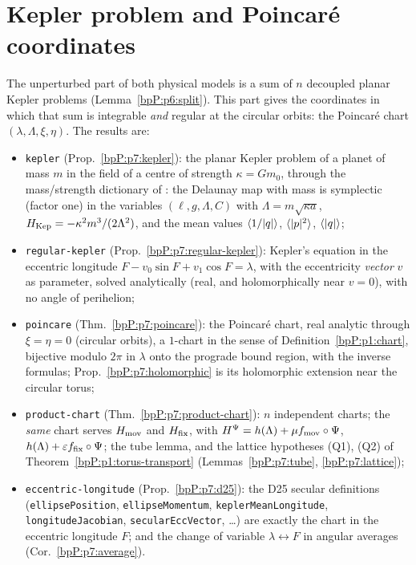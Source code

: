 \section{Kepler problem and Poincar\'e coordinates}\label{bpP:p7}
\begingroup\sloppy

The unperturbed part of both physical models is a sum of $n$ decoupled planar Kepler problems (Lemma~\ref{bpP:p6:split}). This part
gives the coordinates in which that sum is integrable \emph{and} regular at the circular orbits: the Poincar\'e chart
$(\lambda,\Lambda,\xi,\eta)$. The results are:
\begin{itemize}
\item \texttt{kepler} (Prop.~\ref{bpP:p7:kepler}): the planar Kepler problem of a planet of mass $m$ in the field of a centre of strength $\kappa=Gm_0$, through the
mass/strength dictionary of : the Delaunay map with mass is symplectic (factor one) in the variables $(\ell,g,\Lambda,C)$ with $\Lambda=m\sqrt{\kappa a}$,
$H_{\rm Kep}=-\kappa^2m^3/(2\Lambda^2)$, and the mean values $\langle1/\lvert q\rvert\rangle$, $\langle\lvert p\rvert^2\rangle$, $\langle\lvert q\rvert\rangle$;
\item \texttt{regular-kepler} (Prop.~\ref{bpP:p7:regular-kepler}): Kepler's equation in the eccentric longitude $F-v_0\sin F+v_1\cos F=\lambda$, with the eccentricity \emph{vector} $v$ as parameter, solved
analytically (real, and holomorphically near $v=0$), with no angle of perihelion;
\item \texttt{poincare} (Thm.~\ref{bpP:p7:poincare}): the Poincar\'e chart, real analytic through $\xi=\eta=0$ (circular orbits), a $1$-chart in the sense of
Definition~\ref{bpP:p1:chart}, bijective modulo $2\pi$ in $\lambda$ onto the prograde bound region, with the inverse formulas; Prop.~\ref{bpP:p7:holomorphic} is its holomorphic
extension near the circular torus;
\item \texttt{product-chart} (Thm.~\ref{bpP:p7:product-chart}): $n$ independent charts; the \emph{same} chart serves $H_{\rm mov}$ and $H_{\rm fix}$, with $H^\Psi=h(\Lambda)+\mu f_{\rm mov}\circ\Psi$,
$h(\Lambda)+\varepsilon f_{\rm fix}\circ\Psi$; the tube lemma, and the lattice hypotheses (Q1), (Q2) of Theorem~\ref{bpP:p1:torus-transport} (Lemmas~\ref{bpP:p7:tube}, \ref{bpP:p7:lattice});
\item \texttt{eccentric-longitude} (Prop.~\ref{bpP:p7:d25}): the D25 secular definitions (\texttt{ellipsePosition}, \texttt{ellipseMomentum}, \texttt{keplerMeanLongitude}, \texttt{longitudeJacobian}, \texttt{secularEccVector}, \dots)
are exactly the chart in the eccentric longitude $F$; and the change of variable $\lambda\leftrightarrow F$ in angular averages (Cor.~\ref{bpP:p7:average}).
\end{itemize}
